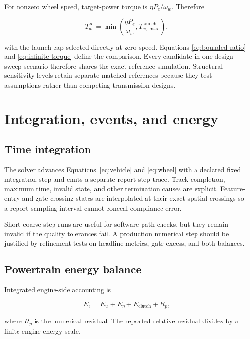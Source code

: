 \documentclass[11pt,oneside]{report}
\begin{document}
For nonzero wheel speed, target-power torque is $\eta P_e/\omega_w$.  Therefore

\begin{equation}
T_w^{\infty}=\min\left(\frac{\eta P_e}{\omega_w},
T_{w,\max}^{\mathrm{launch}}\right),
\label{eq:infinite-torque}
\end{equation}

with the launch cap selected directly at zero speed. Equations
\eqref{eq:bounded-ratio} and \eqref{eq:infinite-torque} define the comparison. Every
candidate in one design-sweep scenario therefore shares the exact reference simulation.
Structural-sensitivity levels retain separate matched references because they test
assumptions rather than competing transmission designs.

\chapter{Integration, events, and energy}\label{ch:numerics}

\section{Time integration}

The solver advances Equations~\eqref{eq:vehicle} and \eqref{eq:wheel} with a declared
fixed integration step and emits a separate report-step trace.  Track completion,
maximum time, invalid state, and other termination causes are explicit.  Feature-entry
and gate-crossing states are interpolated at their exact spatial crossings so a report
sampling interval cannot conceal compliance error.

Short coarse-step runs are useful for software-path checks, but they remain invalid if
the quality tolerances fail.  A production numerical step should be justified by
refinement tests on headline metrics, gate excess, and both balances.

\section{Powertrain energy balance}

Integrated engine-side accounting is

\begin{equation}
E_e=E_w+E_{\eta}+E_{\mathrm{clutch}}+R_p,
\label{eq:powertrain-balance}
\end{equation}

where $R_p$ is the numerical residual.  The reported relative residual divides by a
finite engine-energy scale.
\end{document}
